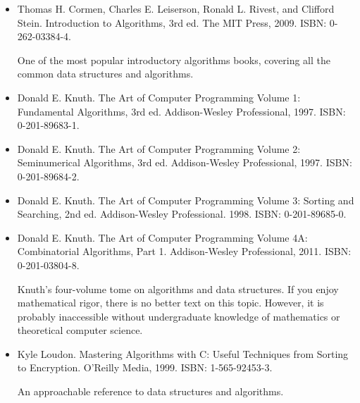 \begin{itemize}
\item
Thomas H. Cormen, Charles E. Leiserson, Ronald L. Rivest, and Clifford Stein. Introduction to Algorithms, 3rd ed. The MIT Press, 2009. ISBN: 0-262-03384-4.

One of the most popular introductory algorithms books, covering all the common data structures and algorithms.

\item
Donald E. Knuth. The Art of Computer Programming Volume 1: Fundamental Algorithms, 3rd ed. Addison-Wesley Professional, 1997. ISBN: 0-201-89683-1.

\item
Donald E. Knuth. The Art of Computer Programming Volume 2: Seminumerical Algorithms, 3rd ed. Addison-Wesley Professional, 1997. ISBN: 0-201-89684-2.

\item
Donald E. Knuth. The Art of Computer Programming Volume 3: Sorting and Searching, 2nd ed. Addison-Wesley Professional. 1998. ISBN: 0-201-89685-0.

\item
Donald E. Knuth. The Art of Computer Programming Volume 4A: Combinatorial Algorithms, Part 1. Addison-Wesley Professional, 2011. ISBN: 0-201-03804-8.

Knuth’s four-volume tome on algorithms and data structures. If you enjoy mathematical rigor, there is no better text on this topic. However, it is probably inaccessible without undergraduate knowledge of mathematics or theoretical computer science.

\item
Kyle Loudon. Mastering Algorithms with C: Useful Techniques from Sorting to Encryption. O’Reilly Media, 1999. ISBN: 1-565-92453-3.

An approachable reference to data structures and algorithms.
\end{itemize}